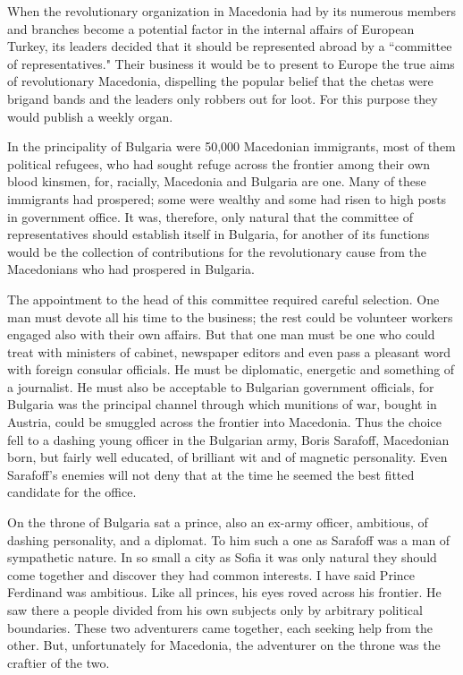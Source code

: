 \documentclass[a5paper,12pt]{book}
\begin{document}
When the revolutionary organization in Macedonia had by its numerous members and branches become a potential factor in the internal affairs of European Turkey, its leaders decided that it should be represented abroad by a “committee of representatives." Their business it would be to present to Europe the true aims of revolutionary Macedonia, dispelling the popular belief that the chetas were brigand bands and the leaders only robbers out for loot. For this purpose they would publish a weekly organ.

In the principality of Bulgaria were 50,000 Macedonian immigrants, most of them political refugees, who had sought refuge across the frontier among their own blood kinsmen, for, racially, Macedonia and Bulgaria are one. Many of these immigrants had prospered; some were wealthy and some had risen to high posts in government office. It was, therefore, only natural that the committee of representatives should establish itself in Bulgaria, for another of its functions would be the collection of contributions for the revolutionary cause from the Macedonians who had prospered in Bulgaria.

The appointment to the head of this committee required careful selection. One man must devote all his time to the business; the rest could be volunteer workers engaged also with their own affairs. But that one man must be one who could treat with ministers of cabinet, newspaper editors and even pass a pleasant word with foreign consular officials.
He must be diplomatic, energetic and something of a journalist. He must also be acceptable to Bulgarian government officials, for Bulgaria was the principal channel through which munitions of war, bought in Austria, could be smuggled across the frontier into Macedonia. Thus the choice fell to a dashing young officer in the Bulgarian army, Boris Sarafoff, Macedonian born, but fairly well educated, of brilliant wit and of magnetic personality. Even Sarafoff’s enemies will not deny that at the time he seemed the best fitted candidate for the office.

On the throne of Bulgaria sat a prince, also an ex-army officer, ambitious, of dashing personality, and a diplomat. To him such a one as Sarafoff was a man of sympathetic nature. In so small a city as Sofia it was only natural they should come together and discover they had common interests. I have said Prince Ferdinand was ambitious. Like all princes, his eyes roved across his frontier. He saw there a people divided from his own subjects only by arbitrary political boundaries. These two adventurers came together, each seeking help from the other. But, unfortunately for Macedonia, the adventurer on the throne was the craftier of the two.
\end{document}
